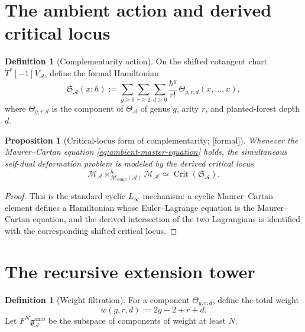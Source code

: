 \documentclass[11pt,oneside]{memoir}
\numberwithin{equation}{chapter}
\newtheorem{proposition}[theorem]{Proposition}
\theoremstyle{definition}
\newtheorem{definition}[theorem]{Definition}
\newcommand{\ClaimStatusFormal}{\textnormal{[formal]}}
\newcommand{\cA}{\mathcal A}
\newcommand{\cM}{\mathcal M}
\newcommand{\fg}{\mathfrak g}
\newcommand{\h}{\hbar}
\newcommand{\Crit}{\operatorname{Crit}}
\newcommand{\Linf}{L_{\infty}}
\begin{document}
\section{The ambient action and derived critical locus}

\begin{definition}[Complementarity action]
\label{def:ambient-action}
On the shifted cotangent chart \(T^*[-1]V_{\cA}\), define the formal Hamiltonian
\begin{equation}
\label{eq:ambient-formal-action}
\mathfrak S_{\cA}(x;\h)
:=
\sum_{g\ge 0}\sum_{r\ge 2}\sum_{d\ge 0}
\frac{\h^g}{r!}\,\Theta_{g,r;d}(x,\ldots,x),
\end{equation}
where \(\Theta_{g,r;d}\) is the component of \(\Theta_{\cA}\) of genus \(g\), arity \(r\), and planted-forest depth \(d\).
\end{definition}

\begin{proposition}[Critical-locus form of complementarity; \ClaimStatusFormal]
\label{prop:critical-locus-form}
Whenever the Maurer--Cartan equation \eqref{eq:ambient-master-equation} holds, the simultaneous self-dual deformation problem is modeled by the derived critical locus
\begin{equation}
\label{eq:derived-critical-locus-complementarity}
\cM_{\cA}\times^h_{\cM_{\mathrm{comp}}(\cA)}\cM_{\cA^!}
\simeq
\Crit(\mathfrak S_{\cA}).
\end{equation}
\end{proposition}

\begin{proof}
This is the standard cyclic \(\Linf\) mechanism: a cyclic Maurer--Cartan element defines a Hamiltonian whose Euler--Lagrange equation is the Maurer--Cartan equation, and the derived intersection of the two Lagrangians is identified with the corresponding shifted critical locus.
\end{proof}

\section{The recursive extension tower}

\begin{definition}[Weight filtration]
\label{def:weight-filtration}
For a component \(\Theta_{g,r;d}\), define the total weight
\begin{equation}
\label{eq:total-weight}
w(g,r,d):=2g-2+r+d.
\end{equation}
Let \(F^N\fg^{\mathrm{amb}}_{\cA}\) be the subspace of components of weight at least \(N\).
\end{definition}
\end{document}
